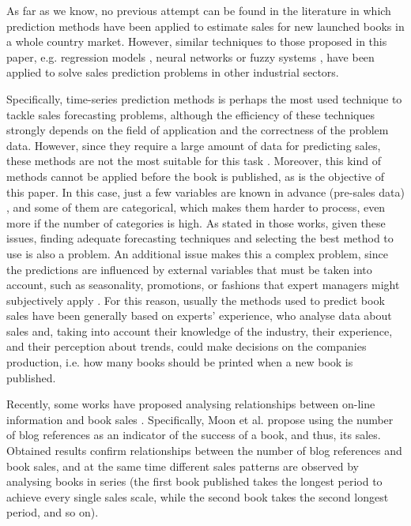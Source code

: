 \documentclass[a4paper,10pt,twocolumn,preprint,3p]{elsarticle}
\begin{document}
As far as we know, no previous attempt can be found in the literature in which prediction methods have been applied to estimate sales for new launched books in a whole country market. However, similar techniques to those proposed in this paper, e.g. regression models \cite{Papalexopoulos1990}, neural networks \cite{Yoo1999} or fuzzy systems \cite{Mastorocostas2001}, have been applied to solve sales prediction problems in other industrial sectors.

Specifically, time-series prediction methods
\cite{Chu2003,Brown1959,Winters1960,Box1969,Papalexopoulos1990,KayacanUK10} 
is perhaps the most used technique to tackle sales forecasting
problems, although the efficiency of these techniques strongly depends on the 
field of application and the correctness of the problem data. However, since 
they require a large amount of data for predicting sales, these methods are not 
the most suitable for this task \cite{ChingChin2010}. 
Moreover, this kind of methods cannot be applied before the book is published, 
as is the objective of this paper. 
In this case, just a few variables are known in advance (pre-sales data)
\cite{ChingChin2010,FaderHardie2005,Madsen2008}, and some of 
them are categorical, which makes them harder to process, even more if 
the number of categories is high. As stated in those works, given these issues, 
finding adequate forecasting techniques and selecting the best method to use 
is also a problem.
An additional issue makes this a complex problem, since the predictions are 
influenced by external variables that must be taken into account, such as
seasonality, promotions, or fashions that expert managers might
subjectively apply \cite{Lapide1999,ChernWSF15}.
For this reason, usually the methods used to predict book sales have
been generally based on experts' experience, who analyse data about sales and, 
taking into account their knowledge of the industry, their experience, 
and their perception about trends, could make decisions on the companies 
production, i.e. how many books should be printed when a new book is published. 

Recently, some works have proposed analysing relationships between on-line 
information and book sales \cite{Moon2010ICSSSM,Moon2010ICEC}. 
Specifically, Moon et al. propose using the number of blog references as an 
indicator of the success of a book, and thus, its sales. 
Obtained results confirm relationships between the number of blog references 
and book sales, and at the same time different sales patterns are observed 
by analysing books in series (the first book published takes the longest period 
to achieve every single sales scale, while the second book takes the second 
longest period, and so on).
\end{document}
